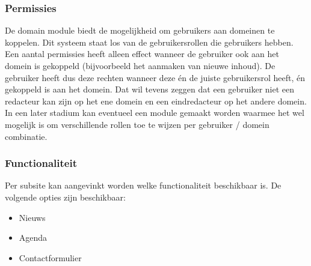 \subsubsection{Permissies}
De domain module biedt de mogelijkheid om gebruikers aan domeinen te koppelen. Dit systeem staat los van de gebruikersrollen die gebruikers hebben. Een aantal permissies heeft alleen effect wanneer de gebruiker ook aan het domein is gekoppeld (bijvoorbeeld het aanmaken van nieuwe inhoud). De gebruiker heeft dus deze rechten wanneer deze \'{e}n de juiste gebruikersrol heeft, \'{e}n gekoppeld is aan het domein. Dat wil tevens zeggen dat een gebruiker niet een redacteur kan zijn op het ene domein en een eindredacteur op het andere domein. In een later stadium kan eventueel een module gemaakt worden waarmee het wel mogelijk is om verschillende rollen toe te wijzen per gebruiker / domein combinatie.

\subsubsection{Functionaliteit}
Per subsite kan aangevinkt worden welke functionaliteit beschikbaar is. De volgende opties zijn beschikbaar:
\begin{itemize}
\item Nieuws
\item Agenda
\item Contactformulier
\end{itemize}
